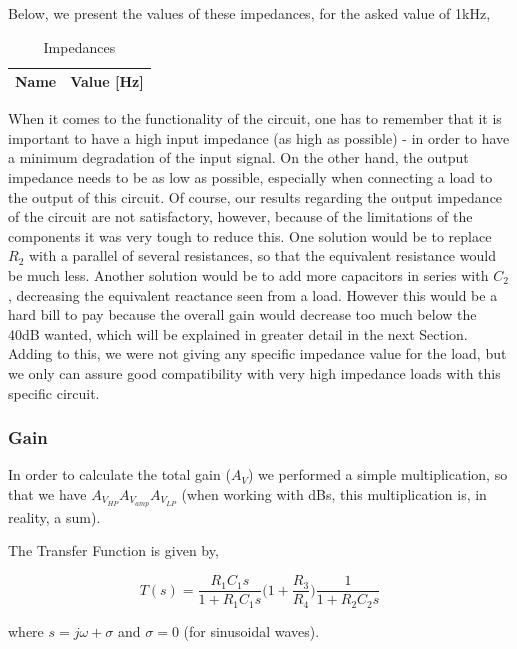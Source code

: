 Below, we present the values of these impedances, for the asked value of 1kHz,

\begin{table}[h]
    \centering
    \begin{tabular}{|l|c|}
    \hline
    {\bf Name} & {\bf Value [Hz]} \\ \hline
    
   \end{tabular}
   \caption{Impedances}
   \label{tab:theo_imp}
\end{table}

When it comes to the functionality of the circuit, one has to remember that it is important to have a high input impedance (as high as possible) - in order to have a minimum degradation of the input signal. On the other hand, the output impedance needs to be as low as possible, especially when connecting a load to the output of this circuit. Of course, our results regarding the output impedance of the circuit are not satisfactory, however, because of the limitations of the components it was very tough to reduce this. One solution would be to replace $R_2$ with a parallel of several resistances, so that the equivalent resistance would be much less. Another solution would be to add more capacitors in series with $C_2$, decreasing the equivalent reactance seen from a load. However this would be a hard bill to pay because the overall gain would decrease too much below the 40dB wanted, which will be explained in greater detail in the next Section. Adding to this, we were not giving any specific impedance value for the load, but we only can assure good compatibility with very high impedance loads with this specific circuit.  

\subsubsection{Gain}

In order to calculate the total gain ($A_{V}$) we performed a simple multiplication, so that we have $A_{V_{HP}}A_{V_{amp}}A_{V_{LP}}$ (when working with dBs, this multiplication is, in reality, a sum). 

The Transfer Function is given by,

\begin{equation}
    T(s)=\frac{R_1C_1s}{1+R_1C_1s}\bigg(1+\frac{R_3}{R_4}\bigg)\frac{1}{1+R_2C_2s}
\end{equation}

where $s=j\omega+\sigma$ and $\sigma=0$ (for sinusoidal waves).

